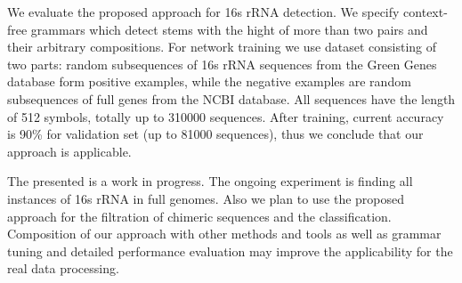 \documentclass[12pt]{article}  %
\theoremstyle{definition}
\theoremstyle{remark}
\begin{document}
We evaluate the proposed approach for 16s rRNA detection.
We specify context-free grammars which detect stems with the hight of more than two pairs and their arbitrary compositions.
For network training we use dataset consisting of two parts: random subsequences of 16s rRNA sequences from the Green Genes database form positive examples, while the negative examples are random subsequences of full genes from the NCBI database.
All sequences have the length of 512 symbols, totally up to 310000 sequences.
After training, current accuracy is 90\% for validation set (up to 81000 sequences), thus we conclude that our approach is applicable.

The presented is a work in progress. 
The ongoing experiment is finding all instances of 16s rRNA in full genomes.
Also we plan to use the proposed approach for the filtration of chimeric sequences and the classification.
Composition of our approach with other methods and tools as well as grammar tuning and detailed performance evaluation may improve the applicability for the real data processing.
\end{document}

